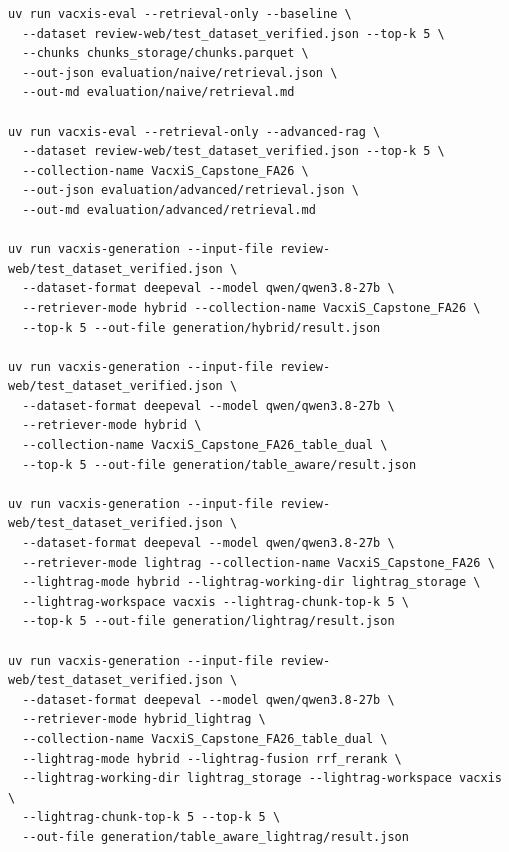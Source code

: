 \documentclass[sn-mathphys, oneside]{sn-jnl}
\begin{document}
\begin{lstlisting}[basicstyle=\ttfamily\scriptsize,breaklines=true,columns=fullflexible]
uv run vacxis-eval --retrieval-only --baseline \
  --dataset review-web/test_dataset_verified.json --top-k 5 \
  --chunks chunks_storage/chunks.parquet \
  --out-json evaluation/naive/retrieval.json \
  --out-md evaluation/naive/retrieval.md

uv run vacxis-eval --retrieval-only --advanced-rag \
  --dataset review-web/test_dataset_verified.json --top-k 5 \
  --collection-name VacxiS_Capstone_FA26 \
  --out-json evaluation/advanced/retrieval.json \
  --out-md evaluation/advanced/retrieval.md

uv run vacxis-generation --input-file review-web/test_dataset_verified.json \
  --dataset-format deepeval --model qwen/qwen3.8-27b \
  --retriever-mode hybrid --collection-name VacxiS_Capstone_FA26 \
  --top-k 5 --out-file generation/hybrid/result.json

uv run vacxis-generation --input-file review-web/test_dataset_verified.json \
  --dataset-format deepeval --model qwen/qwen3.8-27b \
  --retriever-mode hybrid \
  --collection-name VacxiS_Capstone_FA26_table_dual \
  --top-k 5 --out-file generation/table_aware/result.json

uv run vacxis-generation --input-file review-web/test_dataset_verified.json \
  --dataset-format deepeval --model qwen/qwen3.8-27b \
  --retriever-mode lightrag --collection-name VacxiS_Capstone_FA26 \
  --lightrag-mode hybrid --lightrag-working-dir lightrag_storage \
  --lightrag-workspace vacxis --lightrag-chunk-top-k 5 \
  --top-k 5 --out-file generation/lightrag/result.json

uv run vacxis-generation --input-file review-web/test_dataset_verified.json \
  --dataset-format deepeval --model qwen/qwen3.8-27b \
  --retriever-mode hybrid_lightrag \
  --collection-name VacxiS_Capstone_FA26_table_dual \
  --lightrag-mode hybrid --lightrag-fusion rrf_rerank \
  --lightrag-working-dir lightrag_storage --lightrag-workspace vacxis \
  --lightrag-chunk-top-k 5 --top-k 5 \
  --out-file generation/table_aware_lightrag/result.json
\end{lstlisting}
\end{document}
